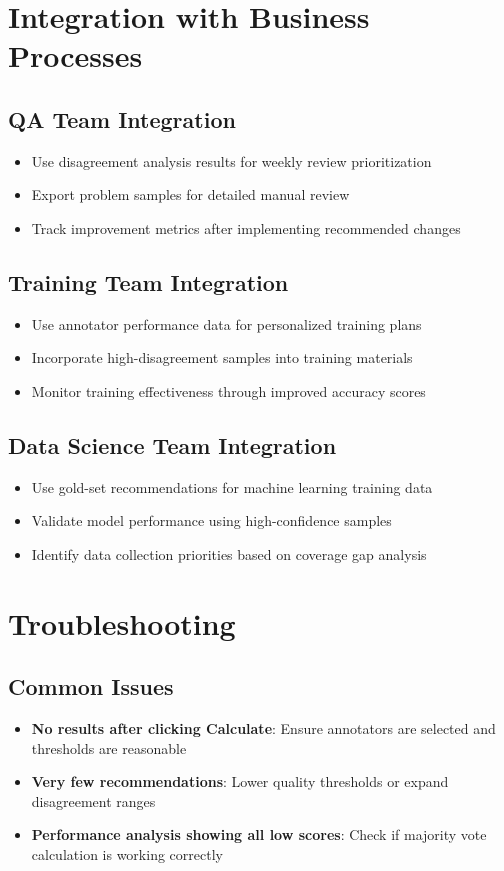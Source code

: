 \documentclass[11pt]{article}
\begin{document}
\section{Integration with Business Processes}

\subsection{QA Team Integration}
\begin{itemize}
\item Use disagreement analysis results for weekly review prioritization
\item Export problem samples for detailed manual review
\item Track improvement metrics after implementing recommended changes
\end{itemize}

\subsection{Training Team Integration}
\begin{itemize}
\item Use annotator performance data for personalized training plans
\item Incorporate high-disagreement samples into training materials
\item Monitor training effectiveness through improved accuracy scores
\end{itemize}

\subsection{Data Science Team Integration}
\begin{itemize}
\item Use gold-set recommendations for machine learning training data
\item Validate model performance using high-confidence samples
\item Identify data collection priorities based on coverage gap analysis
\end{itemize}

\section{Troubleshooting}

\subsection{Common Issues}
\begin{itemize}
\item \textbf{No results after clicking Calculate}: Ensure annotators are selected and thresholds are reasonable
\item \textbf{Very few recommendations}: Lower quality thresholds or expand disagreement ranges
\item \textbf{Performance analysis showing all low scores}: Check if majority vote calculation is working correctly
\end{itemize}
\end{document}
